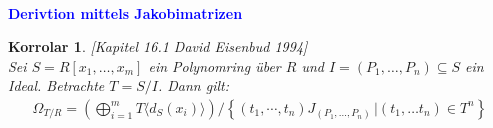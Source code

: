 \documentclass[10pt,a4paper]{report}
\newcommand{\comment}[1]{}
\newcommand{\ModulsOfDifferenzials}{David Eisenbud 1994}
\newcounter{Aussage}[chapter]
\newtheorem{korrolar}[Aussage]{Korrolar}
\newcommand{\function}[5]{\nolinebreak{#1:#2 \longrightarrow #3 \, , \, #4 \longmapsto #5}}
\newcommand{\divR}[2]{\Omega_{#1/#2}}
\newcommand{\divf}[1]{d_{#1}}
\begin{document}
\ \\
\textcolor{blue}{\textbf{Derivtion mittels Jakobimatrizen}}
\begin{korrolar}\label{Derivation mittels Jakobimatrizen} \textit{[Kapitel 16.1 \ModulsOfDifferenzials]}\\
Sei  $S = R[x_1, \dots ,x_m]$ ein Polynomring über $R$ und $I = (P_1,\dots, P_n) \subseteq S$ ein Ideal. Betrachte $T = S/I$. Dann gilt:
\begin{gather*}
\divR{T}{R} 
= \left( \bigoplus_{i = 1}^m T \langle \divf{S}(x_i) \rangle \right) / \left\lbrace (t_1, \cdots, t_n) J_{(P_1,\dots, P_n)} \, \vert (t_1 , \dots t_n) \in T^n \right\rbrace\\
\comment{
vl. Falsch
= \bigoplus_{i  = 1}^m S/(P_1 , \dots , P_n , \delta_{i}(P_1) , \dots \delta_{i}(P_n) \langle \divf{S}(x_i) \rangle)\\
\text{mit: } 
\function{\divf{T}}{T}{\divR{T}{R}}{\left[Q(x_1,\cdots, x_m)\right]_T}{\left( [\delta_1(Q)], \dots , [\delta_m(Q)] \right)}
}
\end{gather*}
\end{korrolar}
\end{document}
